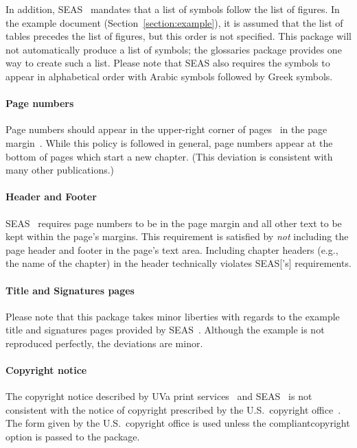 \documentclass[10pt]{article}
\newcommand{\package}[1]{#1}
\newcommand{\option}[1]{#1}
\begin{document}
In addition, \gls{SEAS}~\cite{seas:instructions} mandates that a list of symbols follow the list of figures.
In the example document (Section~\ref{section:example}), it is assumed that the list of tables precedes the list of figures, but this order is not specified.
This package will not automatically produce a list of symbols; the \package{glossaries} package provides one way to create such a list.
Please note that \gls{SEAS} also requires the symbols to appear in alphabetical order with Arabic symbols followed by Greek symbols.

\paragraph{Page numbers}
Page numbers should appear in the upper-right corner of pages~\cite{uvaprint:thesis} in the page margin~\cite{seas:instructions}.
While this policy is followed in general, page numbers appear at the bottom of pages which start a new chapter.
(This deviation is consistent with many other publications.)

\paragraph{Header and Footer}
\Gls{SEAS}~\cite{seas:instructions} requires page numbers to be in the page margin and all other text to be kept within the page's margins.
This requirement is satisfied by \emph{not} including the page header and footer in the page's text area.
Including chapter headers (e.g., the name of the chapter) in the header technically violates \gls{SEAS}['s] requirements.

\paragraph{Title and Signatures pages}
Please note that this package takes minor liberties with regards to the example title and signatures pages provided by \Gls{SEAS}~\cite{seas:instructions}.
Although the example is not reproduced perfectly, the deviations are minor.

\paragraph{Copyright notice}
The copyright notice described by \gls{UVa} print services~\cite{uvaprint:thesis} and \gls{SEAS}~\cite{seas:instructions} is not consistent with the notice of copyright prescribed by the U.S.\ copyright office~\cite{copyright2010copyright}.
The form given by the U.S.\ copyright office is used unless the \option{compliantcopyright} option is passed to the package.
\end{document}
